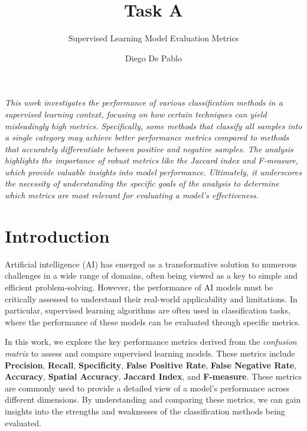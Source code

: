 \documentclass{llncs}
\begin{document}
\title{Task A}
\subtitle{Supervised Learning Model Evaluation Metrics}

\author{Diego De Pablo}

\maketitle 

\vspace{1cm} %

\textit{
	This work investigates the performance of various classification methods in a supervised learning context, focusing on how certain techniques can yield misleadingly high metrics. Specifically, some methods that classify all samples into a single category may achieve better performance metrics compared to methods that accurately differentiate between positive and negative samples. The analysis highlights the importance of robust metrics like the Jaccard index and F-measure, which provide valuable insights into model performance. Ultimately, it underscores the necessity of understanding the specific goals of the analysis to determine which metrics are most relevant for evaluating a model’s effectiveness. }



\section{Introduction}

Artificial intelligence (AI) has emerged as a transformative solution to numerous challenges in a wide range of domains, often being viewed as a key to simple and efficient problem-solving. However, the performance of AI models must be critically assessed to understand their real-world applicability and limitations. In particular, supervised learning algorithms are often used in classification tasks, where the performance of these models can be evaluated through specific metrics.

In this work, we explore the key performance metrics derived from the \textit{confusion matrix} to assess and compare supervised learning models. These metrics include \textbf{Precision}, \textbf{Recall}, \textbf{Specificity}, \textbf{False Positive Rate}, \textbf{False Negative Rate}, \textbf{Accuracy}, \textbf{Spatial Accuracy}, \textbf{Jaccard Index}, and \textbf{F-measure}. These metrics are commonly used to provide a detailed view of a model’s performance across different dimensions. By understanding and comparing these metrics, we can gain insights into the strengths and weaknesses of the classification methods being evaluated.
\end{document}
